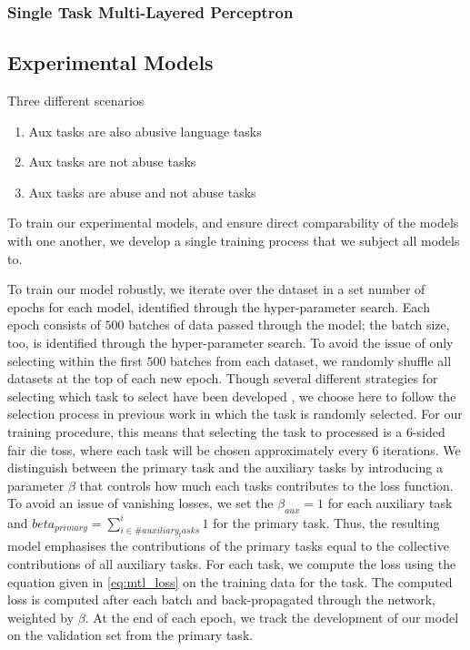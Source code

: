 \subsubsection{Single Task Multi-Layered Perceptron}


\subsection{Experimental Models}

Three different scenarios
\begin{enumerate}
  \item Aux tasks are also abusive language tasks
  \item Aux tasks are not abuse tasks
  \item Aux tasks are abuse and not abuse tasks
\end{enumerate}

To train our experimental models, and ensure direct comparability of the models with one another, we develop a single training process that we subject all models to.\vspace{5mm}

To train our model robustly, we iterate over the dataset in a set number of epochs for each model, identified through the hyper-parameter search. Each epoch consists of $500$ batches of data passed through the model; the batch size, too, is identified through the hyper-parameter search. To avoid the issue of only selecting within the first $500$ batches from each dataset, we randomly shuffle all datasets at the top of each new epoch. Though several different strategies for selecting which task to select have been developed \cite{Waseem:2018}, we choose here to follow the selection process in previous work \cite{Waseem:2018,Rajamanickam:2020} in which the task is randomly selected. For our training procedure, this means that selecting the task to processed is a 6-sided fair die toss, where each task will be chosen approximately every $6$ iterations. We distinguish between the primary task and the auxiliary tasks by introducing a parameter $\beta$ that controls how much each tasks contributes to the loss function. To avoid an issue of vanishing losses, we set the $\beta_{aux} = 1$ for each auxiliary task and $beta_{primary} = \sum^{i}_{i \in \#auxiliary_tasks} 1$ for the primary task. Thus, the resulting model emphasises the contributions of the primary tasks equal to the collective contributions of all auxiliary tasks. For each task, we compute the loss using the equation given in \autoref{eq:mtl_loss} on the training data for the task. The computed loss is computed after each batch and back-propagated through the network, weighted by $\beta$. At the end of each epoch, we track the development of our model on the validation set from the primary task.

